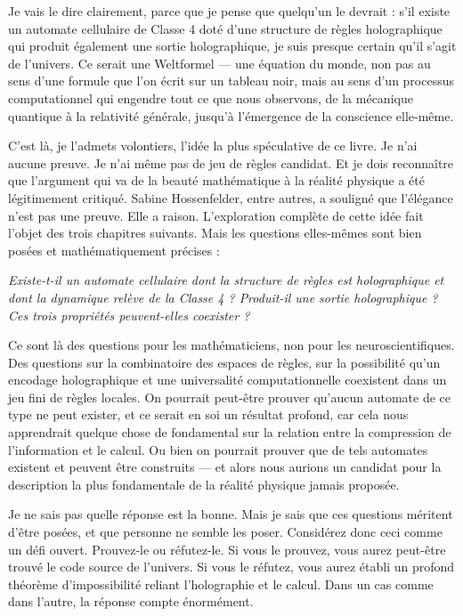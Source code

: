 \documentclass[11pt, twoside, openright]{book}
\begin{document}
Je vais le dire clairement, parce que je pense que quelqu'un le devrait : s'il existe un automate cellulaire de Classe 4 doté d'une structure de règles holographique qui produit également une sortie holographique, je suis presque certain qu'il s'agit de l'univers. Ce serait une Weltformel --- une équation du monde, non pas au sens d'une formule que l'on écrit sur un tableau noir, mais au sens d'un processus computationnel qui engendre tout ce que nous observons, de la mécanique quantique à la relativité générale, jusqu'à l'émergence de la conscience elle-même.

C'est là, je l'admets volontiers, l'idée la plus spéculative de ce livre. Je n'ai aucune preuve. Je n'ai même pas de jeu de règles candidat. Et je dois reconnaître que l'argument qui va de la beauté mathématique à la réalité physique a été légitimement critiqué. Sabine Hossenfelder, entre autres, a souligné que l'élégance n'est pas une preuve. Elle a raison. L'exploration complète de cette idée fait l'objet des trois chapitres suivants. Mais les questions elles-mêmes sont bien posées et mathématiquement précises :

\textit{Existe-t-il un automate cellulaire dont la structure de règles est holographique et dont la dynamique relève de la Classe 4 ? Produit-il une sortie holographique ? Ces trois propriétés peuvent-elles coexister ?}

Ce sont là des questions pour les mathématiciens, non pour les neuroscientifiques. Des questions sur la combinatoire des espaces de règles, sur la possibilité qu'un encodage holographique et une universalité computationnelle coexistent dans un jeu fini de règles locales. On pourrait peut-être prouver qu'aucun automate de ce type ne peut exister, et ce serait en soi un résultat profond, car cela nous apprendrait quelque chose de fondamental sur la relation entre la compression de l'information et le calcul. Ou bien on pourrait prouver que de tels automates existent et peuvent être construits --- et alors nous aurions un candidat pour la description la plus fondamentale de la réalité physique jamais proposée.

Je ne sais pas quelle réponse est la bonne. Mais je sais que ces questions méritent d'être posées, et que personne ne semble les poser. Considérez donc ceci comme un défi ouvert. Prouvez-le ou réfutez-le. Si vous le prouvez, vous aurez peut-être trouvé le code source de l'univers. Si vous le réfutez, vous aurez établi un profond théorème d'impossibilité reliant l'holographie et le calcul. Dans un cas comme dans l'autre, la réponse compte énormément.
\end{document}
